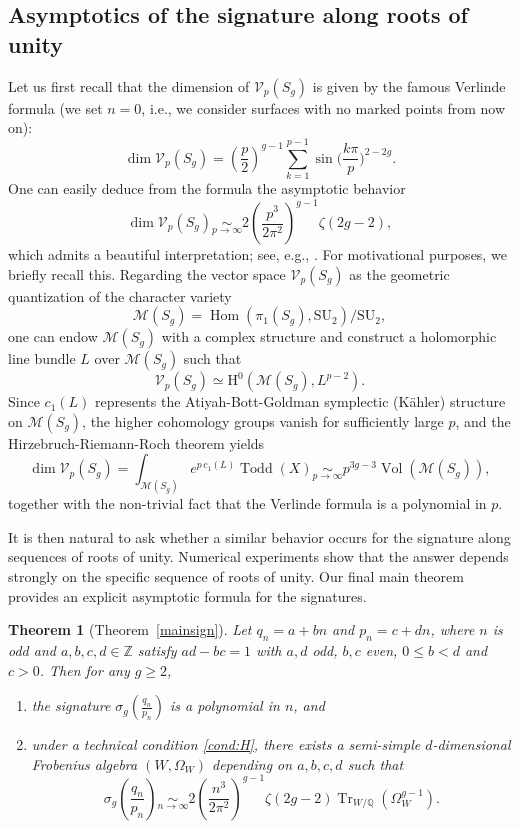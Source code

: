 \documentclass{amsart}
\newcommand{\Q}{\mathbb{Q}}
\newcommand{\Z}{\mathbb{Z}}
\newcommand{\calV}{\mathcal{V}}
\newcommand{\calM}{\mathcal{M}}
\newcommand{\SU}{\mathrm{SU}}
\DeclareMathOperator{\Tr}{Tr}
\DeclareMathOperator{\Hom}{Hom}
\newtheorem{theoremA}{Theorem}
\theoremstyle{definition}
\begin{document}
\subsection{Asymptotics of the signature along roots of unity}

Let us first recall that the dimension of $\calV_p(S_g)$ is given by the famous Verlinde formula (we set $n=0$, i.e., we consider surfaces with no marked points from now on):
$$ \dim \calV_p(S_g)=\left(\frac{p}{2}\right)^{g-1}\sum_{k=1}^{p-1}\sin \big(\frac{k\pi}{p}\big)^{2-2g}.$$
One can easily deduce from the formula the asymptotic behavior 
$$\dim \calV_p(S_g)\underset{p\to\infty}{\sim} 2\left(\frac{p^3}{2\pi^2}\right)^{g-1} \zeta(2g-2),$$
which admits a beautiful interpretation; see, e.g., \cite{Witten}.
For motivational purposes, we briefly recall this. Regarding the vector space $\calV_p(S_g)$ as the geometric quantization of the character variety $$\calM(S_g)=\Hom(\pi_1(S_g),\SU_2)/\SU_2,$$ one can endow $\calM(S_g)$ with a complex structure and construct a holomorphic line bundle $L$ over $\calM(S_g)$ such that 
$$ \calV_p(S_g)\simeq \mathrm{H}^0(\calM(S_g),L^{p-2}).$$
Since $c_1(L)$ represents the Atiyah-Bott-Goldman symplectic (Kähler) structure on $\calM(S_g)$, the higher cohomology groups vanish for sufficiently large $p$, and the Hirzebruch-Riemann-Roch theorem yields
$$\dim \calV_p(S_g)=\int_{\calM(S_g)}e^{p \, c_1(L)}\operatorname{Todd}(X)\underset{p\to\infty}{\sim}p^{3g-3}\operatorname{Vol}(\calM(S_g)),$$
together with the non-trivial fact that the Verlinde formula is a polynomial in $p$.

It is then natural to ask whether a similar behavior occurs for the signature along sequences of roots of unity. Numerical experiments show that the answer depends strongly on the specific sequence of roots of unity. Our final main theorem provides an explicit asymptotic formula for the signatures.

\begin{theoremA}[Theorem~\ref{mainsign}]
Let $q_n=a+bn$ and $p_n=c+dn$, where $n$ is odd and $a,b,c,d \in \Z$ satisfy $ad-bc=1$ with $a,d$  odd, $b,c$ even, $0\le b<d$ and $c>0$.
Then for any $g\ge 2$, 
\begin{enumerate}
    \item the signature $\sigma_g(\frac{q_n}{p_n})$ is a polynomial in $n$, and
    \item under a technical condition \eqref{cond:H}, there exists a semi-simple $d$-dimensional Frobenius algebra $(W,\Omega_W)$ depending on $a,b,c,d$ such that 
$$\sigma_g \left(\frac{q_n}{p_n}\right)\underset{n\to\infty}{\sim}2\left(\frac{n^3}{2\pi^2}\right)^{g-1} \! \! \zeta(2g-2)\Tr_{W/\Q}(\Omega_W^{g-1}).$$
\end{enumerate}
\end{theoremA}
\end{document}
